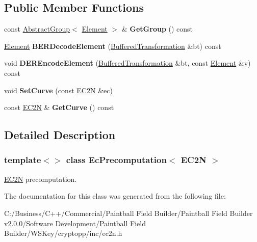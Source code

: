\subsection*{Public Member Functions}
\begin{DoxyCompactItemize}
\item 
\hypertarget{class_ec_precomputation_3_01_e_c2_n_01_4_aaa584cd955a7d9fee6c1beb2407a2657}{
const \hyperlink{class_abstract_group}{AbstractGroup}$<$ \hyperlink{struct_e_c2_n_point}{Element} $>$ \& {\bfseries GetGroup} () const }
\label{class_ec_precomputation_3_01_e_c2_n_01_4_aaa584cd955a7d9fee6c1beb2407a2657}

\item 
\hypertarget{class_ec_precomputation_3_01_e_c2_n_01_4_a60cbbe0b18feb98dfd7a3409ea67f9e4}{
\hyperlink{struct_e_c2_n_point}{Element} {\bfseries BERDecodeElement} (\hyperlink{class_buffered_transformation}{BufferedTransformation} \&bt) const }
\label{class_ec_precomputation_3_01_e_c2_n_01_4_a60cbbe0b18feb98dfd7a3409ea67f9e4}

\item 
\hypertarget{class_ec_precomputation_3_01_e_c2_n_01_4_aae5d36244eb147ef182e0ab3a3c6f0e1}{
void {\bfseries DEREncodeElement} (\hyperlink{class_buffered_transformation}{BufferedTransformation} \&bt, const \hyperlink{struct_e_c2_n_point}{Element} \&v) const }
\label{class_ec_precomputation_3_01_e_c2_n_01_4_aae5d36244eb147ef182e0ab3a3c6f0e1}

\item 
\hypertarget{class_ec_precomputation_3_01_e_c2_n_01_4_a409adbeecc3435736d437c5dc6ac4f4b}{
void {\bfseries SetCurve} (const \hyperlink{class_e_c2_n}{EC2N} \&ec)}
\label{class_ec_precomputation_3_01_e_c2_n_01_4_a409adbeecc3435736d437c5dc6ac4f4b}

\item 
\hypertarget{class_ec_precomputation_3_01_e_c2_n_01_4_a0756b58bbe40a49ef6566e56df00b287}{
const \hyperlink{class_e_c2_n}{EC2N} \& {\bfseries GetCurve} () const }
\label{class_ec_precomputation_3_01_e_c2_n_01_4_a0756b58bbe40a49ef6566e56df00b287}

\end{DoxyCompactItemize}


\subsection{Detailed Description}
\subsubsection*{template$<$$>$ class EcPrecomputation$<$ EC2N $>$}

\hyperlink{class_e_c2_n}{EC2N} precomputation. 

The documentation for this class was generated from the following file:\begin{DoxyCompactItemize}
\item 
C:/Business/C++/Commercial/Paintball Field Builder/Paintball Field Builder v2.0.0/Software Development/Paintball Field Builder/WSKey/cryptopp/inc/ec2n.h\end{DoxyCompactItemize}
